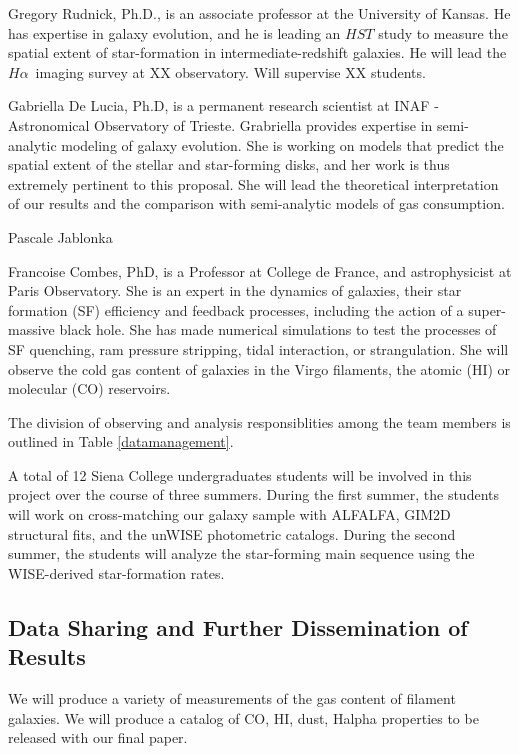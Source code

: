 \documentclass[12pt, preprint]{aastex}
\newcommand{\ha}{$H\alpha$}
\begin{document}
{Gregory Rudnick, Ph.D., is an associate professor at the University of
Kansas.  He has expertise in galaxy evolution, and he is leading an
$HST$ study to measure the spatial extent of star-formation in
intermediate-redshift galaxies.  He will lead the \ha \ imaging survey
at XX observatory.   Will supervise XX students.


Gabriella De Lucia, Ph.D, is a permanent research scientist at INAF -
Astronomical Observatory of Trieste.  Grabriella provides expertise in
semi-analytic modeling of galaxy evolution. She is working on models
that predict the spatial extent of the stellar and star-forming disks,
and her work is thus extremely pertinent to this proposal.  She will lead
the theoretical interpretation of our results and the comparison
with semi-analytic models of gas consumption.

Pascale Jablonka


Francoise Combes, PhD, is a Professor at College de France, and astrophysicist at Paris Observatory. She is an expert in the dynamics of galaxies, their star formation (SF) efficiency and feedback processes, including the action of a super-massive black hole. She has made numerical simulations to test the processes of SF quenching, ram pressure stripping, tidal interaction, or strangulation. She will observe the cold gas content of galaxies in the Virgo filaments, the atomic (HI) or molecular (CO) reservoirs.

The division of observing and analysis responsiblities among the team
members is outlined in Table \ref{datamanagement}. 


A total of 12 Siena College undergraduates students will be involved
in this project over the course of three summers.  During the first
summer, the students will work on cross-matching our galaxy sample
with ALFALFA, GIM2D structural fits, and the unWISE photometric catalogs.  During the second summer, the
students will analyze the star-forming main sequence using the
WISE-derived star-formation rates.

%


\vspace*{-.8cm}\subsection{Data Sharing and Further Dissemination of Results }
\vspace*{-.3cm}
We will produce a variety of measurements of the gas content of
filament galaxies.  We will produce a catalog of CO, HI, dust, Halpha
properties to be released with our final paper.

}
\end{document}
